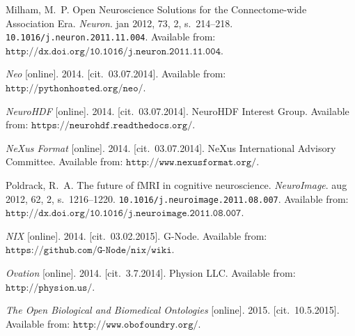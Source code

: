 \documentclass[conference]{IEEEtran}
\begin{document}
\begin{thebibliography}{1}
{\sc Milham}, M.~P.
\newblock Open Neuroscience Solutions for the Connectome-wide Association Era.
\newblock \emph{Neuron}. jan 2012, 73, 2, s.~214--218.
\newblock \texttt{10.1016/j.neuron.2011.11.004}.
\newblock Available from:
$\texttt{{http://dx.doi.org/10.1016/j.neuron.2011.11.004}}$.

\emph{Neo} [online]. 2014. [cit.~03.07.2014].
\newblock Available from: $\texttt{{http://pythonhosted.org/neo/}}$.

\emph{NeuroHDF} [online]. 2014. [cit.~03.07.2014]. NeuroHDF Interest Group.
\newblock Available from: $\texttt{{https://neurohdf.readthedocs.org/}}$.

\emph{NeXus Format} [online]. 2014. [cit.~03.07.2014]. NeXus International
Advisory Committee.
\newblock Available from: $\texttt{{http://www.nexusformat.org/}}$.




{\sc Poldrack}, R.~A.
\newblock The future of {fMRI} in cognitive neuroscience.
\newblock \emph{{NeuroImage}}. aug 2012, 62, 2, s.~1216--1220.
\newblock \texttt{10.1016/j.neuroimage.2011.08.007}.
\newblock Available from:
$\texttt{{http://dx.doi.org/10.1016/j.neuroimage.2011.08.007}}$.



\emph{NIX} [online]. 2014. [cit.~03.02.2015]. G-Node.
\newblock Available from: $\texttt{{https://github.com/G-Node/nix/wiki}}$.

\emph{Ovation} [online]. 2014. [cit.~3.7.2014]. Physion LLC.
\newblock Available from: $\texttt{{http://physion.us/}}$.


\emph{The Open Biological and Biomedical Ontologies} [online]. 2015.
[cit.~10.5.2015].
\newblock Available from: $\texttt{{http://www.obofoundry.org/}}$.
\end{thebibliography}




\end{document}
